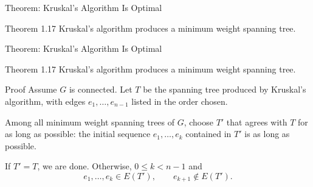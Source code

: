 \documentclass[aspectratio=169,11pt]{beamer}
\begin{document}
\begin{frame}[t]{Theorem: Kruskal's Algorithm Is Optimal}
\large
\begin{block}{Theorem 1.17}
Kruskal's algorithm produces a minimum weight spanning tree.
\end{block}
\end{frame}

\begin{frame}[t]{Theorem: Kruskal's Algorithm Is Optimal}
\large
\begin{block}{Theorem 1.17}
Kruskal's algorithm produces a minimum weight spanning tree.
\end{block}
\begin{block}{Proof}
\normalsize
Assume $G$ is connected. Let $T$ be the spanning tree produced by Kruskal's algorithm, with edges $e_1,\ldots,e_{n-1}$ listed in the order chosen.
\par\medskip
Among all minimum weight spanning trees of $G$, choose $T'$ that agrees with $T$ for as long as possible: the initial sequence $e_1,\ldots,e_k$ contained in $T'$ is as long as possible.
\par\medskip
If $T'=T$, we are done. Otherwise, $0\le k<n-1$ and
\[
e_1,\ldots,e_k\in E(T'),\qquad e_{k+1}\notin E(T').
\]
\end{block}
\end{frame}
\end{document}
